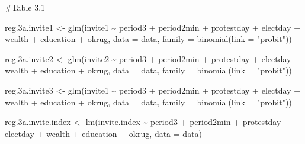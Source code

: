 \documentclass[
  letterpaper,
  DIV=11,
  numbers=noendperiod]{scrartcl}
\newenvironment{Shaded}{\begin{snugshade}}{\end{snugshade}}
\newcommand{\AttributeTok}[1]{\textcolor[rgb]{0.40,0.45,0.13}{#1}}
\newcommand{\CommentTok}[1]{\textcolor[rgb]{0.37,0.37,0.37}{#1}}
\newcommand{\FloatTok}[1]{\textcolor[rgb]{0.68,0.00,0.00}{#1}}
\newcommand{\FunctionTok}[1]{\textcolor[rgb]{0.28,0.35,0.67}{#1}}
\newcommand{\NormalTok}[1]{\textcolor[rgb]{0.00,0.23,0.31}{#1}}
\newcommand{\OtherTok}[1]{\textcolor[rgb]{0.00,0.23,0.31}{#1}}
\newcommand{\SpecialCharTok}[1]{\textcolor[rgb]{0.37,0.37,0.37}{#1}}
\newcommand{\StringTok}[1]{\textcolor[rgb]{0.13,0.47,0.30}{#1}}
\begin{document}
\begin{Shaded}
\begin{Highlighting}[]
\CommentTok{\#Table 3.1}

\NormalTok{reg}\FloatTok{.3}\NormalTok{a.invite1 }\OtherTok{\textless{}{-}} \FunctionTok{glm}\NormalTok{(invite1 }\SpecialCharTok{\textasciitilde{}}\NormalTok{ period3 }\SpecialCharTok{+}\NormalTok{ period2min }\SpecialCharTok{+}\NormalTok{ protestday }\SpecialCharTok{+}\NormalTok{ electday }\SpecialCharTok{+}\NormalTok{ wealth }\SpecialCharTok{+}
\NormalTok{                        education }\SpecialCharTok{+}\NormalTok{ okrug, }\AttributeTok{data =}\NormalTok{ data, }\AttributeTok{family =} \FunctionTok{binomial}\NormalTok{(}\AttributeTok{link =} \StringTok{"probit"}\NormalTok{))}

\NormalTok{reg}\FloatTok{.3}\NormalTok{a.invite2 }\OtherTok{\textless{}{-}} \FunctionTok{glm}\NormalTok{(invite2 }\SpecialCharTok{\textasciitilde{}}\NormalTok{ period3 }\SpecialCharTok{+}\NormalTok{ period2min }\SpecialCharTok{+}\NormalTok{ protestday }\SpecialCharTok{+}\NormalTok{ electday }\SpecialCharTok{+}\NormalTok{ wealth }\SpecialCharTok{+}
\NormalTok{                        education }\SpecialCharTok{+}\NormalTok{ okrug, }\AttributeTok{data =}\NormalTok{ data, }\AttributeTok{family =} \FunctionTok{binomial}\NormalTok{(}\AttributeTok{link =} \StringTok{"probit"}\NormalTok{))}

\NormalTok{reg}\FloatTok{.3}\NormalTok{a.invite3 }\OtherTok{\textless{}{-}} \FunctionTok{glm}\NormalTok{(invite1 }\SpecialCharTok{\textasciitilde{}}\NormalTok{ period3 }\SpecialCharTok{+}\NormalTok{ period2min }\SpecialCharTok{+}\NormalTok{ protestday }\SpecialCharTok{+}\NormalTok{ electday }\SpecialCharTok{+}\NormalTok{ wealth }\SpecialCharTok{+}
\NormalTok{                        education }\SpecialCharTok{+}\NormalTok{ okrug, }\AttributeTok{data =}\NormalTok{ data, }\AttributeTok{family =} \FunctionTok{binomial}\NormalTok{(}\AttributeTok{link =} \StringTok{"probit"}\NormalTok{))}

\NormalTok{reg}\FloatTok{.3}\NormalTok{a.invite.index }\OtherTok{\textless{}{-}} \FunctionTok{lm}\NormalTok{(invite.index }\SpecialCharTok{\textasciitilde{}}\NormalTok{ period3 }\SpecialCharTok{+}\NormalTok{ period2min }\SpecialCharTok{+}\NormalTok{ protestday }\SpecialCharTok{+}\NormalTok{ electday }\SpecialCharTok{+} 
\NormalTok{                             wealth }\SpecialCharTok{+}\NormalTok{ education }\SpecialCharTok{+}\NormalTok{ okrug, }\AttributeTok{data =}\NormalTok{ data)}


\end{Highlighting}
\end{Shaded}
\end{document}
